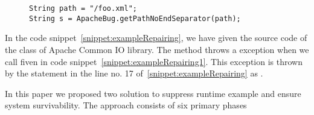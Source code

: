 \begin{figure}[t]
\begin{lstlisting}
String path = "/foo.xml"; 
String s = ApacheBug.getPathNoEndSeparator(path);
\end{lstlisting}
\end{figure}

In the code snippet~\ref{snippet:exampleRepairing}, we have given the source
code of the  class of Apache Common IO library. The method
 throws a  exception
when we call  fiven in code
snippet~\ref{snippet:exampleRepairing1}. This exception is thrown by the
statement  in the
line no. 17 of~\ref{snippet:exampleRepairing} as .

In this paper we proposed two solution to suppress runtime example and ensure
system survivability. The approach consists of six primary phases

